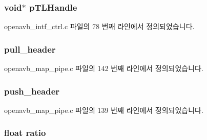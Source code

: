 \subsubsection[{\texorpdfstring{p\+T\+L\+Handle}{pTLHandle}}]{\setlength{\rightskip}{0pt plus 5cm}void$\ast$ p\+T\+L\+Handle}\hypertarget{structpvt__data__t_a17bf97c9962379fa3092579f846a007e}{}\label{structpvt__data__t_a17bf97c9962379fa3092579f846a007e}


openavb\+\_\+intf\+\_\+ctrl.\+c 파일의 78 번째 라인에서 정의되었습니다.

\subsubsection[{\texorpdfstring{pull\+\_\+header}{pull_header}}]{ pull\+\_\+header}\hypertarget{structpvt__data__t_a74c84c3f9bd89a8c9ab8fcd0c7d54763}{}\label{structpvt__data__t_a74c84c3f9bd89a8c9ab8fcd0c7d54763}


openavb\+\_\+map\+\_\+pipe.\+c 파일의 142 번째 라인에서 정의되었습니다.

\subsubsection[{\texorpdfstring{push\+\_\+header}{push_header}}]{ push\+\_\+header}\hypertarget{structpvt__data__t_afba90c4fe404a574c4c65a7c83908143}{}\label{structpvt__data__t_afba90c4fe404a574c4c65a7c83908143}


openavb\+\_\+map\+\_\+pipe.\+c 파일의 139 번째 라인에서 정의되었습니다.

\subsubsection[{\texorpdfstring{ratio}{ratio}}]{\setlength{\rightskip}{0pt plus 5cm}float ratio}\hypertarget{structpvt__data__t_a207ad05f99cc72068a92358861ff5e71}{}\label{structpvt__data__t_a207ad05f99cc72068a92358861ff5e71}


